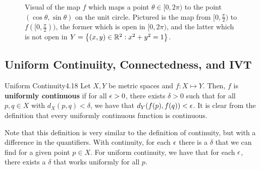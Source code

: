 \begin{figure}[htbp]
    \centering
    
    \caption{Visual of the map $f$ which maps a point $\theta \in [0, 2\pi)$ to the point $(\cos\theta, \sin\theta)$ on the unit circle. Pictured is the map from $[0, \frac{\pi}{2})$ to $f([0, \frac{\pi}{2}))$, the former which is open in $[0, 2\pi)$, and the latter which is not open in $Y = \set{(x, y) \in \mathbb{R}^2: x^2 + y^2 = 1}$.}
    \label{fig19}
\end{figure}

\subsection{Uniform Continuiity, Connectedness, and IVT}

\setcounter{rudin}{17}
\begin{definition}{Uniform Continuity}{4.18}
    Let $X, Y$ be metric spaces and $f: X \mapsto Y$. Then, $f$ is \textbf{uniformly continuous} if for all $\epsilon > 0$, there exists $\delta > 0$ such that for all $p, q \in X$ with $d_X(p, q) < \delta$, we have that $d_Y(f(p), f(q)) < \epsilon$. It is clear from the definition that every uniformly continuous function is continuous.
\end{definition}
\noindent Note that this definition is very similar to the definition of continuity, but with a difference in the quantifiers. With continuity, for each $\epsilon$ there is a $\delta$ that we can find for a given point $p \in X$. For uniform continuity, we have that for each $\epsilon$, there exists a $\delta$ that works uniformly for all $p$. 

